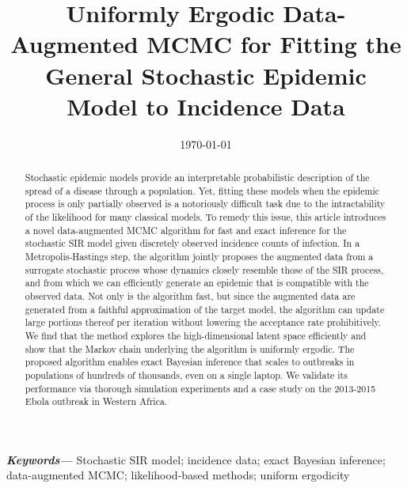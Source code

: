 \documentclass[11pt]{article}
\begin{document}
	
	\providecommand{\keywords}[1]
	{
		\small	
		\textbf{\textit{Keywords---}} #1
	}
	
	
	\title{%
		Uniformly Ergodic Data-Augmented MCMC for Fitting the General Stochastic Epidemic Model to Incidence Data}
		
	\author{
	}
	\date{
	\today
	}	
	\maketitle
	
	\begin{abstract}
		Stochastic epidemic models provide an interpretable probabilistic description of the spread of a disease through a population. Yet, fitting these models when the epidemic process is only partially observed is a notoriously difficult task due to the intractability of the likelihood for many classical models. To remedy this issue, this article introduces a novel data-augmented MCMC algorithm for fast and exact inference for the stochastic SIR model given discretely observed incidence counts of infection. In a Metropolis-Hastings step, the algorithm jointly proposes the augmented data from a surrogate stochastic process whose dynamics closely resemble those of the SIR process, and from which we can efficiently generate an epidemic that is compatible with the observed data. Not only is the algorithm fast, but since the augmented data are generated from a faithful approximation of the target model, the algorithm can update large portions thereof per iteration without lowering the acceptance rate prohibitively. We find that the method explores the high-dimensional latent space efficiently and show that the Markov chain underlying the algorithm is uniformly ergodic.
		The proposed algorithm enables exact Bayesian inference that scales to outbreaks in populations of hundreds of thousands, even on a single laptop. We validate its performance via thorough simulation experiments and a case study on the 2013-2015 Ebola outbreak in Western Africa.
	\end{abstract}
	\keywords{Stochastic SIR model; incidence data; exact Bayesian inference; data-augmented MCMC; likelihood-based methods; uniform ergodicity}
	
\end{document}
